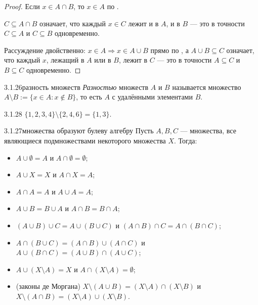 \begin{proof}
 Если $x \in A \cap B$, то $x \in A$ по
.

 $C \subseteq
A \cap B$ означает, что каждый $x \in C$ лежит и в $A$, и в $B$ — это в точности
$C \subseteq A$ и $C \subseteq B$ одновременно.

 Рассуждение двойственно: $x \in A \Rightarrow x \in A \cup B$ прямо
по , а $A \cup B \subseteq C$ означает, что каждый $x$, лежащий
в $A$ или в $B$, лежит в $C$ — это в точности $A \subseteq C$ и $B \subseteq C$
одновременно.
\end{proof}

\begin{definition}{3.1.26}{разность множеств}
\emph{Разностью} множеств $A$ и $B$ называется множество
$A \setminus B := \{x \in A : x \notin B\}$, то есть $A$ с удалёнными элементами $B$.
\end{definition}

\begin{example}{3.1.28}{}
$\{1,2,3,4\} \setminus \{2,4,6\} = \{1,3\}$.
\end{example}

\begin{proposition}{3.1.27}{множества образуют булеву алгебру}
Пусть $A,B,C$ — множества, все являющиеся подмножествами некоторого множества $X$. Тогда:
\begin{itemize}
  \item[(a)] $A \cup \emptyset = A$ и $A \cap \emptyset = \emptyset$;
  \item[(b)] $A \cup X = X$ и $A \cap X = A$;
  \item[(c)] $A \cap A = A$ и $A \cup A = A$;
  \item[(d)] $A \cup B = B \cup A$ и $A \cap B = B \cap A$;
  \item[(e)] $(A \cup B) \cup C = A \cup (B \cup C)$ и $(A \cap B) \cap C = A \cap (B \cap C)$;
  \item[(f)] $A \cap (B \cup C) = (A \cap B) \cup (A \cap C)$ и
        $A \cup (B \cap C) = (A \cup B) \cap (A \cup C)$;
  \item[(g)] $A \cup (X \setminus A) = X$ и $A \cap (X \setminus A) = \emptyset$;
  \item[(h)] (законы де Моргана) $X \setminus (A \cup B) = (X \setminus A) \cap (X \setminus B)$
        и $X \setminus (A \cap B) = (X \setminus A) \cup (X \setminus B)$.
\end{itemize}
\end{proposition}

